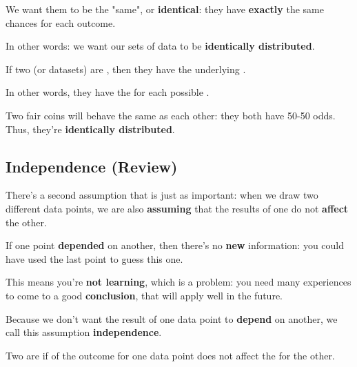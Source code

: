         We want them to be the "same", or \textbf{identical}: they have \textbf{exactly} the same chances for each outcome.
        
        In other words: we want our sets of data to be \textbf{identically distributed}.\\
        
        \begin{definition}
            If two (or datasets) are , then they have the  underlying .
            
            In other words, they have the   for each possible .
        \end{definition}
        
        \miniex Two fair coins will behave the same as each other: they both have 50-50 odds. Thus, they're \textbf{identically distributed}.
        
        
    \subsection{Independence (Review)}
        
        There's a second assumption that is just as important: when we draw two different data points, we are also \textbf{assuming} that the results of one do not \textbf{affect} the other. 
        
        If one point \textbf{depended} on another, then there's no \textbf{new} information: you could have used the last point to guess this one.
        
        This means you're \textbf{not learning}, which is a problem: you need many experiences to come to a good \textbf{conclusion}, that will apply well in the future.
        
        Because we don't want the result of one data point to \textbf{depend} on another, we call this assumption \textbf{independence}.\\
        
        \begin{definition}
            Two  are  if  of the outcome for one data point does not affect the  for the other.
        \end{definition}
        
        
